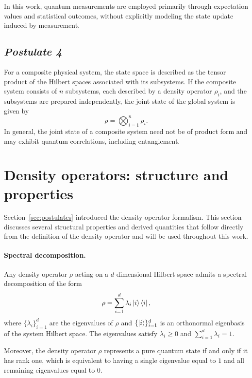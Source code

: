 In this work, quantum measurements are employed primarily through expectation values and statistical outcomes, without explicitly modeling the state update induced by measurement.

\subsection*{\small\textit{Postulate 4}}

For a composite physical system, the state space is described as the tensor product of the Hilbert spaces associated with its subsystems. If the composite system consists of $n$ subsystems, each described by a density operator $\rho_i$, and the subsystems are prepared independently, the joint state of the global system is given by
\begin{equation}
    \rho = \bigotimes_{i=1}^{n} \rho_i .
\end{equation}
In general, the joint state of a composite system need not be of product form and may exhibit quantum correlations, including entanglement.

\section{Density operators: structure and properties}
\label{sec:density_operators}

Section~\ref{sec:postulates} introduced the density operator formalism. This section discusses several structural properties and derived quantities that follow directly from the definition of the density operator and will be used throughout this work.

\paragraph{Spectral decomposition.}
Any density operator $\rho$ acting on a $d$-dimensional Hilbert space admits a spectral decomposition of the form
\begin{equation}
    \rho = \sum_{i=1}^{d} \lambda_i \ket{i}\bra{i},
\end{equation}
where $\{\lambda_i\}_{i=1}^{d}$ are the eigenvalues of $\rho$ and $\{\ket{i}\}_{i=1}^{d}$ is an orthonormal eigenbasis of the system Hilbert space. The eigenvalues satisfy $\lambda_i \geq 0$ and $\sum_{i=1}^{d} \lambda_i = 1$.

Moreover, the density operator $\rho$ represents a pure quantum state if and only if it has rank one, which is equivalent to having a single eigenvalue equal to $1$ and all remaining eigenvalues equal to $0$.

